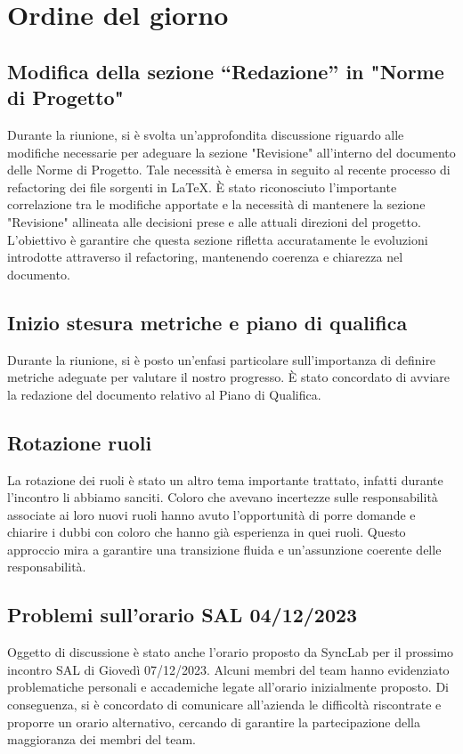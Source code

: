 \documentclass{article}
\begin{document}
\section{Ordine del giorno}
    \subsection{Modifica della sezione “Redazione” in "Norme di Progetto"}
    Durante la riunione, si è svolta un'approfondita discussione riguardo alle modifiche necessarie per adeguare la sezione "Revisione" all'interno del documento delle Norme di Progetto. Tale necessità è emersa in seguito al recente processo di refactoring dei file sorgenti in \LaTeX. È stato riconosciuto l'importante correlazione tra le modifiche apportate e la necessità di mantenere la sezione "Revisione" allineata alle decisioni prese e alle attuali direzioni del progetto. L'obiettivo è garantire che questa sezione rifletta accuratamente le evoluzioni introdotte attraverso il refactoring, mantenendo coerenza e chiarezza nel documento.
    \subsection{Inizio stesura metriche e piano di qualifica}
    Durante la riunione, si è posto un'enfasi particolare sull'importanza di definire metriche adeguate per valutare il nostro progresso. È stato concordato di avviare la redazione del documento relativo al Piano di Qualifica.
    \subsection{Rotazione ruoli}
    La rotazione dei ruoli è stato un altro tema importante trattato, infatti durante l'incontro li abbiamo sanciti. Coloro che avevano incertezze sulle responsabilità associate ai loro nuovi ruoli hanno avuto l'opportunità di porre domande e chiarire i dubbi con coloro che hanno già esperienza in quei ruoli. Questo approccio mira a garantire una transizione fluida e un'assunzione coerente delle responsabilità.
    \subsection{Problemi sull'orario SAL 04/12/2023}
     Oggetto di discussione è stato anche l'orario proposto da SyncLab per il prossimo incontro SAL di Giovedì 07/12/2023. Alcuni membri del team hanno evidenziato problematiche personali e accademiche legate all'orario inizialmente proposto. Di conseguenza, si è concordato di comunicare all'azienda le difficoltà riscontrate e proporre un orario alternativo, cercando di garantire la partecipazione della maggioranza dei membri del team.
\end{document}
